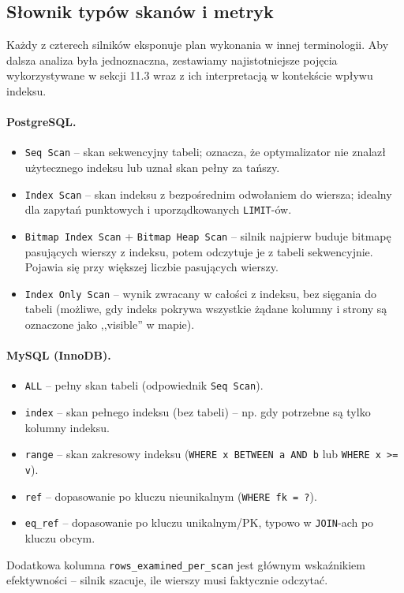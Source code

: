 \subsection{Słownik typów skanów i metryk}

Każdy z czterech silników eksponuje plan wykonania w innej
terminologii. Aby dalsza analiza była jednoznaczna, zestawiamy
najistotniejsze pojęcia wykorzystywane w sekcji 11.3 wraz z ich
interpretacją w kontekście wpływu indeksu.

\paragraph{PostgreSQL.}
\begin{itemize}
    \item \texttt{Seq Scan} -- skan sekwencyjny tabeli; oznacza, że
    optymalizator nie znalazł użytecznego indeksu lub uznał skan
    pełny za tańszy.
    \item \texttt{Index Scan} -- skan indeksu z bezpośrednim odwołaniem
    do wiersza; idealny dla zapytań punktowych i uporządkowanych
    \texttt{LIMIT}-ów.
    \item \texttt{Bitmap Index Scan} + \texttt{Bitmap Heap Scan} --
    silnik najpierw buduje bitmapę pasujących wierszy z indeksu, potem
    odczytuje je z tabeli sekwencyjnie. Pojawia się przy większej liczbie
    pasujących wierszy.
    \item \texttt{Index Only Scan} -- wynik zwracany w całości z indeksu,
    bez sięgania do tabeli (możliwe, gdy indeks pokrywa wszystkie
    żądane kolumny i strony są oznaczone jako ,,visible'' w mapie).
\end{itemize}

\paragraph{MySQL (InnoDB).}
\begin{itemize}
    \item \texttt{ALL} -- pełny skan tabeli (odpowiednik \texttt{Seq Scan}).
    \item \texttt{index} -- skan pełnego indeksu (bez tabeli) -- np.
    gdy potrzebne są tylko kolumny indeksu.
    \item \texttt{range} -- skan zakresowy indeksu
    (\texttt{WHERE x BETWEEN a AND b} lub \texttt{WHERE x >= v}).
    \item \texttt{ref} -- dopasowanie po kluczu nieunikalnym
    (\texttt{WHERE fk = ?}).
    \item \texttt{eq\_ref} -- dopasowanie po kluczu unikalnym/PK,
    typowo w \texttt{JOIN}-ach po kluczu obcym.
\end{itemize}
\noindent Dodatkowa kolumna \texttt{rows\_examined\_per\_scan} jest
głównym wskaźnikiem efektywności -- silnik szacuje, ile wierszy musi
faktycznie odczytać.

